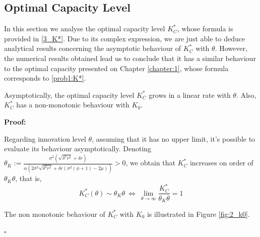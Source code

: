 \subsection{Optimal Capacity Level}

In this section we analyse the optimal capacity level $K^*_C$, whose formula is provided in \eqref{3_K*}. Due to its complex expression, we are just able to deduce analytical results concerning the asymptotic behaviour of $K^*_C$ with $\theta$. However, the numerical results obtained lead us to conclude that it has a similar behaviour to the optimal capacity presented on Chapter \ref{chapter:1}, whose formula corresponds to \eqref{prob1:K*}.

\begin{prop}
Asymptotically, the optimal capacity level $K^*_C$ grows in a linear rate with $\theta$. Also, $K^*_C$ has a non-monotonic behaviour with $K_0$. 
\end{prop}

\textbf{Proof:}

Regarding innovation level $\theta$, assuming that it has no upper limit, it's possible to evaluate its behaviour asymptotically. Denoting $\theta_K:=\frac{\sigma ^2 \left(\sqrt{\delta ^2 r^2}+\delta  r\right)}{\alpha  \left(2 \sigma ^2 \sqrt{\delta ^2 r^2}+\delta  r \left(\sigma ^2 (\phi +1)-2 \mu \right)\right)}>0$, we obtain that $K^*_C$ increases on order of $\theta_K \theta$, that is,
$$K^*_C(\theta) \sim \theta_K \theta \ \Leftrightarrow \ \lim_{\theta \to \infty}  \frac{K^*_C}{\theta_K \theta}=1 $$


The non monotonic behaviour of $K^*_C$ with $K_0$ is illustrated in Figure \ref{fig:2_k0}.
\begin{flushright}
	$\square$
\end{flushright}
\vspace{2cm}



